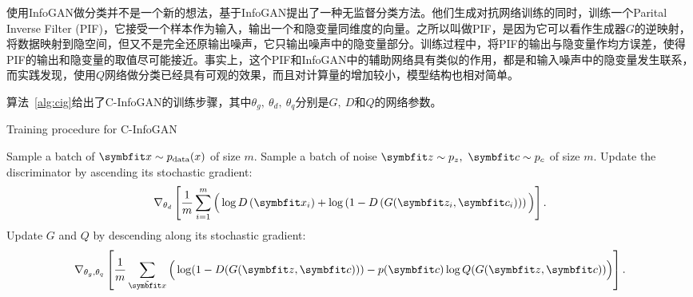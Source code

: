 使用InfoGAN做分类并不是一个新的想法，\citet{zhang2018cramer}基于InfoGAN提出了一种无监督分类方法。他们生成对抗网络训练的同时，训练一个Parital Inverse Filter (PIF)，它接受一个样本作为输入，输出一个和隐变量同维度的向量。之所以叫做PIF，是因为它可以看作生成器$G$的逆映射，将数据映射到隐空间，但又不是完全还原输出噪声，它只输出噪声中的隐变量部分。训练过程中，将PIF的输出与隐变量作均方误差，使得PIF的输出和隐变量的取值尽可能接近。事实上，这个PIF和InfoGAN中的辅助网络具有类似的作用，都是和输入噪声中的隐变量发生联系，而实践发现，使用$Q$网络做分类已经具有可观的效果，而且对计算量的增加较小，模型结构也相对简单。

算法~\ref{alg:cig}给出了C-InfoGAN的训练步骤，其中$\theta_g,~\theta_d,~\theta_q$分别是$G, ~D$和$Q$的网络参数。
\begin{algorithm}[htbp]
  \small
  \caption{Training procedure for C-InfoGAN}
  \label{alg:cig}
  \begin{algorithmic}[1]
      \State Sample a batch of $\bd{x} \sim p_{\text{data}}(x)$ of size $m$.
      \State Sample a batch of noise $\bd{z}\sim p_z, ~\bd{c}\sim p_c$ of size
      $m$.
      \State Update the discriminator by ascending its stochastic gradient:
      \[
        \nabla_{\theta_d} \left[ 
          \frac{1}{m} \sum_{i=1}^m \Big( 
            \log D\left(\bd{x}_i\right) + 
            \log\left( 1 - D\left( G(\bd{z}_i, \bd{c}_i) \right) \right)
          \Big)
        \right].
      \]
      \State Update $G$ and $Q$ by descending along its stochastic gradient:
      \[
        \nabla_{\theta_g,\theta_q} \left[ 
          \frac{1}{m} \sum_{\tilde{\bd{x}}} \Big(
            \log(1 - D(G(\bd{z},\bd{c}))) -
            p(\bd{c})\log Q(G(\bd{z}, \bd{c}))
          \Big)
        \right].
      \]
    \EndFor
  \end{algorithmic}
\end{algorithm}

